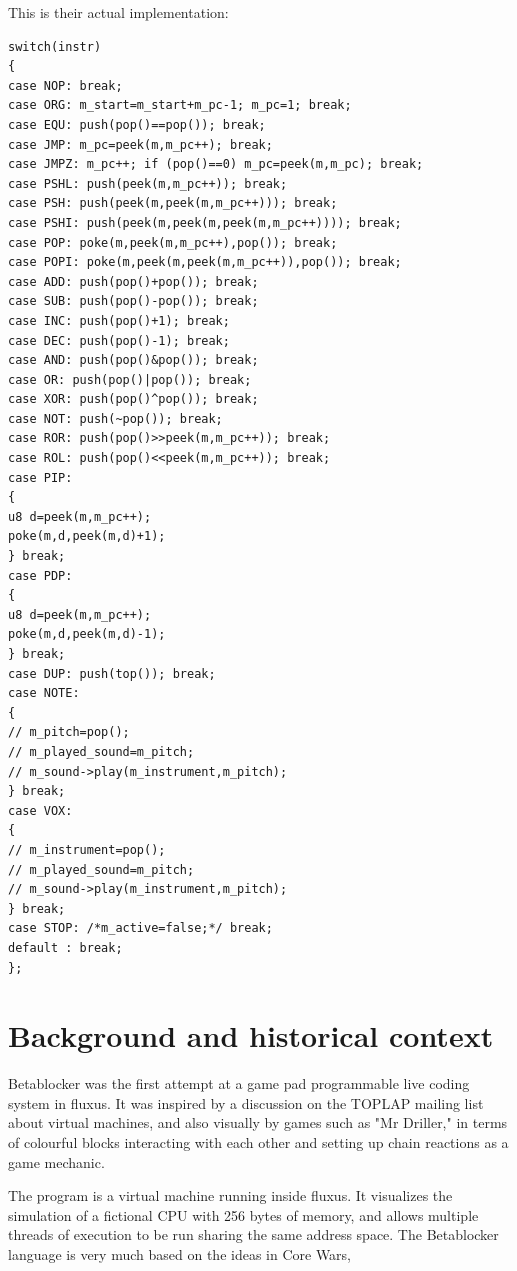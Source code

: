 \documentclass[letterpaper, 12pt]{article}
\begin{document}
This is their actual implementation:

\begin{Verbatim}[fontfamily=courier, xleftmargin=\parindent]
switch(instr)
{
case NOP: break;
case ORG: m_start=m_start+m_pc-1; m_pc=1; break;
case EQU: push(pop()==pop()); break;
case JMP: m_pc=peek(m,m_pc++); break;
case JMPZ: m_pc++; if (pop()==0) m_pc=peek(m,m_pc); break;
case PSHL: push(peek(m,m_pc++)); break;
case PSH: push(peek(m,peek(m,m_pc++))); break;
case PSHI: push(peek(m,peek(m,peek(m,m_pc++)))); break;
case POP: poke(m,peek(m,m_pc++),pop()); break;
case POPI: poke(m,peek(m,peek(m,m_pc++)),pop()); break;
case ADD: push(pop()+pop()); break;
case SUB: push(pop()-pop()); break;
case INC: push(pop()+1); break;
case DEC: push(pop()-1); break;
case AND: push(pop()&pop()); break;
case OR: push(pop()|pop()); break;
case XOR: push(pop()^pop()); break;
case NOT: push(~pop()); break;
case ROR: push(pop()>>peek(m,m_pc++)); break;
case ROL: push(pop()<<peek(m,m_pc++)); break;
case PIP:
{
u8 d=peek(m,m_pc++);
poke(m,d,peek(m,d)+1);
} break;
case PDP:
{
u8 d=peek(m,m_pc++);
poke(m,d,peek(m,d)-1);
} break;
case DUP: push(top()); break;
case NOTE:
{
// m_pitch=pop();
// m_played_sound=m_pitch;
// m_sound->play(m_instrument,m_pitch);
} break;
case VOX:
{
// m_instrument=pop();
// m_played_sound=m_pitch;
// m_sound->play(m_instrument,m_pitch);
} break;
case STOP: /*m_active=false;*/ break;
default : break;
};
\end{Verbatim}


\section{Background and historical context} 
\label{sec:background}


Betablocker was the first attempt at a game pad programmable live coding system in fluxus. It was inspired by a discussion on the TOPLAP mailing list about virtual machines, and also visually by games such as "Mr Driller," in terms of colourful blocks interacting with each other and setting up chain reactions as a game mechanic.

The program is a virtual machine running inside fluxus. It
visualizes the simulation of a fictional CPU with 256 bytes
of memory, and allows multiple threads of execution to be
run sharing the same address space. The Betablocker
language is very much based on the ideas in Core Wars,
\end{document}
